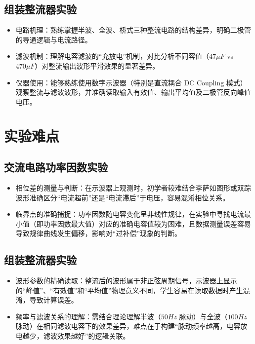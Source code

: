 \documentclass[]{../../templates/Report}%
\begin{document}
\subsection{组装整流器实验}
\begin{itemize}
    \item 电路机理：熟练掌握半波、全波、桥式三种整流电路的结构差异，明确二极管的导通逻辑与电流路径。
    \item 滤波机制：理解电容滤波的“充放电”机制，对比分析不同容值（$47\mu F$ vs $470\mu F$）对整流输出波形平滑效果的显著差异。
    \item 仪器使用：能够熟练使用数字示波器（特别是直流耦合 DC Coupling 模式）观察整流与滤波波形，并准确读取输入有效值、输出平均值及二极管反向峰值电压。
\end{itemize}

\section{实验难点}

\subsection{交流电路功率因数实验}
\begin{itemize}
    \item 相位差的测量与判断：在示波器上观测时，初学者较难结合李萨如图形或双踪波形准确区分“电流超前”还是“电流滞后”于电压，容易混淆相位关系。
    \item 临界点的准确捕捉：功率因数随电容变化呈非线性规律，在实验中寻找电流最小值（即功率因数最大值）对应的准确电容值较为困难，且数据测量误差容易导致规律曲线发生偏移，影响对“过补偿”现象的判断。
\end{itemize}

\subsection{组装整流器实验}
\begin{itemize}
    \item 波形参数的精确读取：整流后的波形属于非正弦周期信号，示波器上显示的“峰值”、“有效值”和“平均值”物理意义不同，学生容易在读取数据时产生混淆，导致计算误差。
    \item 频率与滤波关系的理解：需结合理论理解半波（$50Hz$ 脉动）与全波（$100Hz$ 脉动）在相同滤波电容下的效果差异，难点在于构建“脉动频率越高，电容放电越少，滤波效果越好”的逻辑关联。
\end{itemize}
\end{document}
